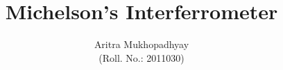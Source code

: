 \documentclass[10pt]{article}
\title{\textbf{Michelson's Interferrometer}}
\author{Aritra Mukhopadhyay\\(Roll. No.: 2011030)}
\date{}
\begin{document}
    \maketitle
    
    \begin{multicols*}{2}
        
        
        
        
        

        
        
        \nocite{*}
    \end{multicols*}
\end{document}
